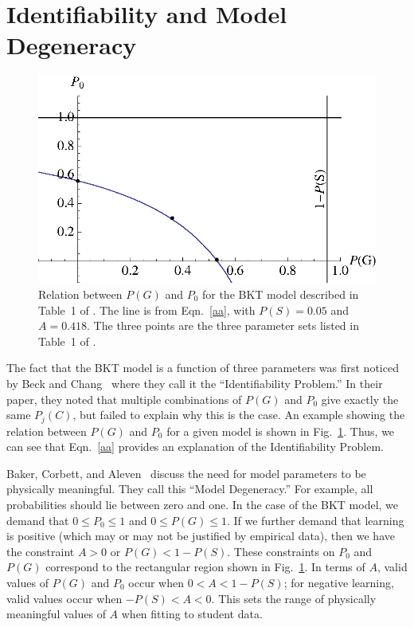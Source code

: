 \documentclass[11pt,letterpaper]{article}
\begin{document}
\section{Identifiability and Model Degeneracy}


\begin{figure}
\centering\includegraphics{table1.eps}
\caption{Relation between $P(G)$ and $P_0$ for the BKT model
  described in Table~1 of \cite{beck_identifiability:_2007}.  
  The line is from Eqn.~\ref{aa}, with $P(S)=0.05$ and $A=0.418$.
  The three points are the  three parameter sets listed in Table~1 of
  \cite{beck_identifiability:_2007}. 
 }
 \label{table1}
\end{figure}


The fact that the BKT model is a function of three parameters
was first noticed by Beck and Chang~\cite{beck_identifiability:_2007} 
where they call it the ``Identifiability Problem.''   In their paper, 
they noted that multiple
combinations of $P(G)$ and $P_0$ give exactly the same $P_j(C)$, but
failed to explain why this is the case.  An example showing the relation
between $P(G)$ and $P_0$ for a given model is shown in Fig.~\ref{table1}.
Thus, we can see that Eqn.~\ref{aa} provides an explanation of the
Identifiability Problem.

Baker, Corbett, and Aleven~\cite{baker_more_2008} discuss the need for 
model parameters to be physically meaningful.  They call this 
``Model Degeneracy.''   For example, all probabilities should lie between zero and one.  
In the case of the BKT model, we demand that $0\le P_0\le 1$ and
 $0\le P(G) \le 1$.
If we further demand that learning is positive (which may or may not be justified
by empirical data), then we have the constraint $A>0$ or $P(G)<1-P(S)$.
These constraints on $P_0$ and $P(G)$ correspond to the rectangular region shown in Fig.~\ref{table1}.
In terms of $A$, valid values of $P(G)$ and $P_0$ occur when
$0<A<1-P(S)$; for negative learning, valid values occur when
$-P(S)<A<0$.  This sets the range of physically meaningful values of
$A$ when fitting to student data.
\end{document}
